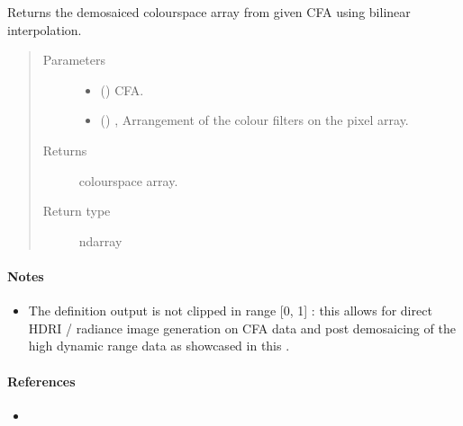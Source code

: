 \documentclass[letterpaper,10pt,english]{sphinxmanual}
\begin{document}
\begin{fulllineitems}
\label{\detokenize{generated/colour_demosaicing.demosaicing_CFA_Bayer_bilinear:colour_demosaicing.demosaicing_CFA_Bayer_bilinear}}
Returns the demosaiced  colourspace array from given  CFA using
bilinear interpolation.
\begin{quote}\begin{description}
\item[{Parameters}] \leavevmode\begin{itemize}
\item {} 
 () \textendash{}  CFA.

\item {} 
 (\sphinxstyleliteralemphasis{, }) \textendash{} ,
Arrangement of the colour filters on the pixel array.

\end{itemize}

\item[{Returns}] \leavevmode
{} colourspace array.

\item[{Return type}] \leavevmode
ndarray

\end{description}\end{quote}
\paragraph{Notes}
\begin{itemize}
\item {} 
The definition output is not clipped in range {[}0, 1{]} : this allows for
direct HDRI / radiance image generation on  CFA data and post
demosaicing of the high dynamic range data as showcased in this
.

\end{itemize}
\paragraph{References}
\begin{itemize}
\item {} 
\label{\detokenize{generated/colour_demosaicing.demosaicing_CFA_Bayer_bilinear:id1}}{\hyperref[\detokenize{bibliography:losson2010c}]{\sphinxcrossref{{[}LMY10{]}}}}


\end{itemize}
\end{fulllineitems}
\end{document}
